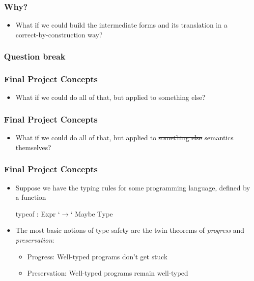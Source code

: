 \documentclass[usenames,dvipsnames]{beamer}
\begin{document}

\begin{frame}[fragile]
  \frametitle{Why?}

  \begin{itemize}
    \item What if we could build the intermediate forms and its translation in a
      correct-by-construction way?
  \end{itemize}
\end{frame}


\begin{frame}[fragile]
  \frametitle{Question break}
\end{frame}


\begin{frame}[fragile]
  \frametitle{Final Project Concepts}

  \begin{itemize}
    \item What if we could do all of that, but applied to something else?
  \end{itemize}
\end{frame}


\begin{frame}[fragile]
  \frametitle{Final Project Concepts}

  \begin{itemize}
    \item What if we could do all of that, but applied to
      \sout{something else} semantics themselves?
  \end{itemize}
\end{frame}


\begin{frame}[fragile]
  \frametitle{Final Project Concepts}

  \begin{itemize}
    \item Suppose we have the typing rules for some programming language,
      defined by a function
      \begin{code}
        typeof : Expr `$\rightarrow$` Maybe Type
      \end{code}

    \item The most basic notions of type safety are the twin theorems of
      \emph{progress} and \emph{preservation}:
      \begin{itemize}
        \item Progress: Well-typed programs don't get stuck
        \item Preservation: Well-typed programs remain well-typed
      \end{itemize}
  \end{itemize}
\end{frame}
\end{document}
